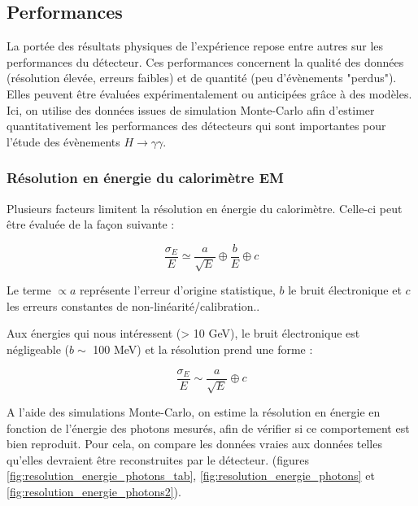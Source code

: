 \documentclass[11pt]{article} %
\begin{document}
\subsection{Performances}

La portée des résultats physiques de l'expérience repose entre autres sur les performances du détecteur. Ces performances concernent la qualité des données (résolution élevée, erreurs faibles) et de quantité (peu d'évènements "perdus"). Elles peuvent être évaluées expérimentalement ou anticipées grâce à des modèles. Ici, on utilise des données issues de simulation Monte-Carlo afin d'estimer quantitativement les performances des détecteurs qui sont importantes pour l'étude des évènements $H \to \gamma \gamma$.

\subsubsection{Résolution en énergie du calorimètre EM}

Plusieurs facteurs limitent la résolution en énergie du calorimètre. Celle-ci peut être évaluée de la façon suivante :

\begin{equation}
\dfrac{\sigma_E}{E} \simeq \dfrac{a}{\sqrt{E}} \oplus \dfrac{b}{E} \oplus c
\end{equation}

Le terme $\propto a$ représente l'erreur d'origine statistique, $b$ le bruit électronique et $c$ les erreurs constantes de non-linéarité/calibration..

Aux énergies qui nous intéressent (> 10 GeV), le bruit électronique est négligeable ($b \sim$ 100 MeV) et la résolution prend une forme :

\begin{equation}
\dfrac{\sigma_E}{E} \sim \dfrac{a}{\sqrt{E}} \oplus c
\end{equation}

A l'aide des simulations Monte-Carlo, on estime la résolution en énergie en fonction de l'énergie des photons mesurés, afin de vérifier si ce comportement est bien reproduit. Pour cela, on compare les données vraies aux données telles qu'elles devraient être reconstruites par le détecteur. (figures \ref{fig:resolution_energie_photons_tab}, \ref{fig:resolution_energie_photons} et \ref{fig:resolution_energie_photons2}).
\end{document}
